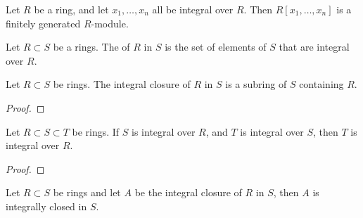 \documentclass{ximera}
\begin{document}
\begin{corollary}
  Let $R$ be a ring, and let $x_1,\dots,x_n$ all be integral over
  $R$. Then $R[x_1,\dots,x_n]$ is a finitely generated $R$-module.
\end{corollary}

\begin{definition}
  Let $R\subset S$ be a rings. The  of $R$ in
  $S$ is the set of elements of $S$ that are integral over $R$.
\end{definition}

\begin{corollary}
  Let $R\subset S$ be rings. The integral closure of $R$ in $S$ is a
  subring of $S$ containing $R$.
  \begin{proof}
  \end{proof}
\end{corollary}

\begin{corollary}
  Let $R\subset S \subset T$ be rings. If $S$ is integral over $R$,
  and $T$ is integral over $S$, then $T$ is integral over $R$.
  \begin{proof}
  \end{proof}
\end{corollary}


\begin{corollary}
  Let $R\subset S$ be rings and let $A$ be the integral closure of $R$
  in $S$, then $A$ is integrally closed in $S$.
\end{corollary}


\begin{proposition}
\end{proposition}

\begin{proposition}
\end{proposition}
\end{document}
